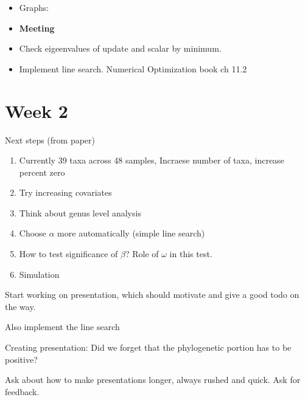 \documentclass[10pt]{article}
\theoremstyle{definition}
\begin{document}
\begin{itemize}
\begin{itemize}
  \item \begin{verbatim}
    [1] "Iteration: 1"
  [1] "phi = 0.939547462231508, omega  = 0.935468698041697 , rho = 3.17044241846978"
  [1] "Beta iteration 1"
  [1] "Difference = 731.214064026175"
  [1] "Iteration: 2"
  [1] "phi = 1.74415189832243e-55, omega  = 0 , rho = 363.857722495099"
  [1] "Beta iteration 1"
  [1] "Difference = 0"
  \end{verbatim}

  \item Try .5 Still only 2 loops.
\end{itemize}

\item Graphs:


\item \textbf{Meeting}
\item Check eigeenvalues of update and scalar by minimum.

\item Implement line search.
Numerical Optimization book ch 11.2

\end{itemize}


\section{Week 2}

Next steps (from paper)
\begin{enumerate}
  \item Currently 39 taxa across 48 samples, Incraese number of taxa, increase percent zero
  \item Try increasing covariates
  \item Think about genus level analysis
  \item Choose $\alpha$ more automatically (simple line search)
  \item How to test significance of $\beta$? Role of $\omega$ in this test.
  \item Simulation
\end{enumerate}

Start working on presentation, which should motivate and give a good todo on the way.

Also implement the line search


Creating presentation: Did we forget that the phylogenetic portion has to be positive?

Ask about how to make presentations longer, always rushed and quick. Ask for feedback.
\end{document}
